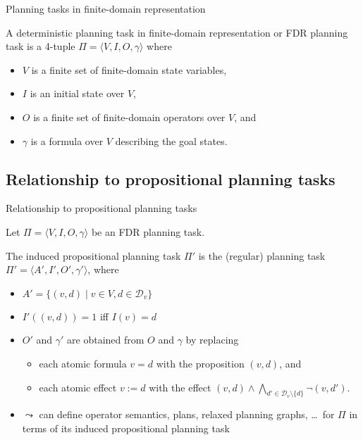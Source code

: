 \documentclass{gkibeamer}
\begin{document}
\begin{frame}{Planning tasks in finite-domain representation}
  \begin{definition}
    A \alert{deterministic planning task in finite-domain
      representation} or \alert{FDR planning task} is a 4-tuple
    $\Pi = \langle V,I,O,\gamma\rangle$ where
    \begin{itemize}
    \item $V$ is a finite set of \alert{finite-domain state
      variables},
    \item $I$ is an \alert{initial state} over $V$,
    \item $O$ is a finite set of \alert{finite-domain operators} over
      $V$, and
    \item $\gamma$ is a formula over $V$ describing the \alert{goal
      states}.
    \end{itemize}
  \end{definition}
\end{frame}

\subsection{Relationship to propositional planning tasks}

\begin{frame}{Relationship to propositional planning tasks}
  \begin{definition}
    Let $\Pi = \langle V,I,O,\gamma\rangle$ be an FDR planning task.

    The \alert{induced propositional planning task} $\Pi'$ is
    the (regular) planning task $\Pi' = \langle A', I', O',
    \gamma'\rangle$, where
    \begin{itemize}
    \item $A' = \{ (v,d) \mid v \in V, d \in \mathcal D_v \}$
    \item $I'((v,d)) = 1$ iff $I(v) = d$
    \item $O'$ and $\gamma'$ are obtained from $O$ and $\gamma$ by replacing
      \begin{itemize}
      \item each atomic formula $v = d$ with the proposition $(v,d)$,
        and
      \item each atomic effect $v := d$ with the effect $(v,d) \land 
        \bigwedge_{d' \in \mathcal D_v \setminus \{d\}} \neg (v, d')$.
      \end{itemize}
    \end{itemize}
  \end{definition}
  \begin{itemize}
  \item $\leadsto$ can define operator semantics, plans, relaxed
    planning graphs, \dots\ for $\Pi$ in terms of its induced
    propositional planning task
  \end{itemize}
\end{frame}
\end{document}
